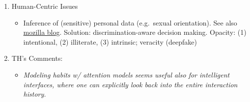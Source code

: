 \documentclass[12pt,a4paper]{article}
\begin{document}
\begin{enumerate}
\begin{itemize}
\end{itemize}
\item Human-Centric Issues
\begin{itemize}
\item Inference of (sensitive) personal data (e.g.~sexual orientation).  See also \href{https://blog.mozilla.org/blog/2019/09/23/introducing-stealing-ur-feelings-an-interactive-documentary-about-big-tech-ai-and-you/}{mozilla blog}. Solution: discrimination-aware decision making. Opacity: (1) intentional, (2) illiterate, (3) intrinsic; veracity (deepfake) 
\end{itemize}
\item TH's Comments: 
\begin{itemize}
\item \textit{Modeling habits w/ attention models seems useful also for intelligent interfaces, where one can explicitly look back into the entire interaction history. }
\end{itemize}
\end{enumerate}
\end{document}
